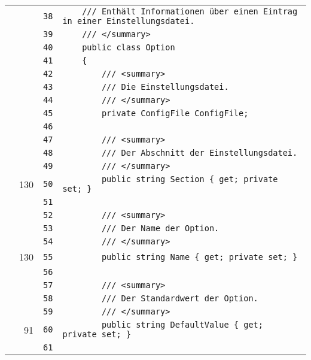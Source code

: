 \documentclass[a4paper,10pt]{article}
\begin{document}
\begin{longtable}[l]{lrrl}
\cellcolor{gray} &  & \verb~38~ & \verb~    /// Enthält Informationen über einen Eintrag in einer Einstellungsdatei.~\\
\cellcolor{gray} &  & \verb~39~ & \verb~    /// </summary>~\\
\cellcolor{gray} &  & \verb~40~ & \verb~    public class Option~\\
\cellcolor{gray} &  & \verb~41~ & \verb~    {~\\
\cellcolor{gray} &  & \verb~42~ & \verb~        /// <summary>~\\
\cellcolor{gray} &  & \verb~43~ & \verb~        /// Die Einstellungsdatei.~\\
\cellcolor{gray} &  & \verb~44~ & \verb~        /// </summary>~\\
\cellcolor{gray} &  & \verb~45~ & \verb~        private ConfigFile ConfigFile;~\\
\cellcolor{gray} &  & \verb~46~ & \verb~~\\
\cellcolor{gray} &  & \verb~47~ & \verb~        /// <summary>~\\
\cellcolor{gray} &  & \verb~48~ & \verb~        /// Der Abschnitt der Einstellungsdatei.~\\
\cellcolor{gray} &  & \verb~49~ & \verb~        /// </summary>~\\
\cellcolor{green} & 130 & \verb~50~ & \verb~        public string Section { get; private set; }~\\
\cellcolor{gray} &  & \verb~51~ & \verb~~\\
\cellcolor{gray} &  & \verb~52~ & \verb~        /// <summary>~\\
\cellcolor{gray} &  & \verb~53~ & \verb~        /// Der Name der Option.~\\
\cellcolor{gray} &  & \verb~54~ & \verb~        /// </summary>~\\
\cellcolor{green} & 130 & \verb~55~ & \verb~        public string Name { get; private set; }~\\
\cellcolor{gray} &  & \verb~56~ & \verb~~\\
\cellcolor{gray} &  & \verb~57~ & \verb~        /// <summary>~\\
\cellcolor{gray} &  & \verb~58~ & \verb~        /// Der Standardwert der Option.~\\
\cellcolor{gray} &  & \verb~59~ & \verb~        /// </summary>~\\
\cellcolor{green} & 91 & \verb~60~ & \verb~        public string DefaultValue { get; private set; }~\\
\cellcolor{gray} &  & \verb~61~ & \verb~~\\

\end{longtable}
\end{document}
